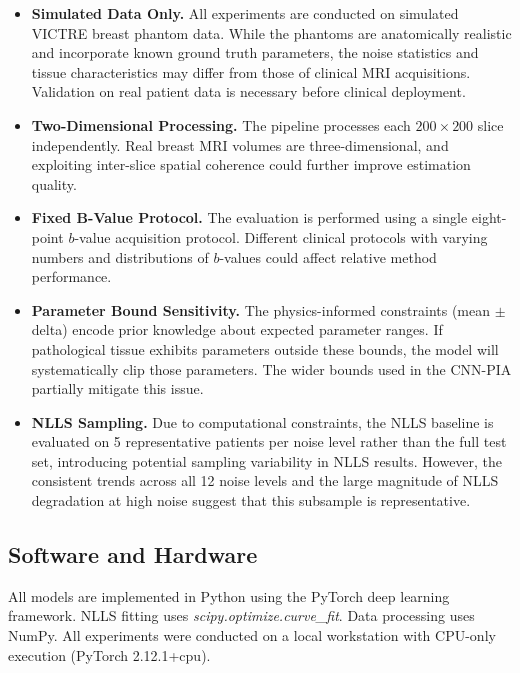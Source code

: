 \documentclass[12pt]{article}
\begin{document}
\begin{itemize}
    \item \textbf{Simulated Data Only.} All experiments are conducted on simulated VICTRE breast phantom data. While the phantoms are anatomically realistic and incorporate known ground truth parameters, the noise statistics and tissue characteristics may differ from those of clinical MRI acquisitions. Validation on real patient data is necessary before clinical deployment.
    \item \textbf{Two-Dimensional Processing.} The pipeline processes each $200{\times}200$ slice independently. Real breast MRI volumes are three-dimensional, and exploiting inter-slice spatial coherence could further improve estimation quality.
    \item \textbf{Fixed B-Value Protocol.} The evaluation is performed using a single eight-point $b$-value acquisition protocol. Different clinical protocols with varying numbers and distributions of $b$-values could affect relative method performance.
    \item \textbf{Parameter Bound Sensitivity.} The physics-informed constraints (mean $\pm$ delta) encode prior knowledge about expected parameter ranges. If pathological tissue exhibits parameters outside these bounds, the model will systematically clip those parameters. The wider bounds used in the CNN-PIA partially mitigate this issue.
    \item \textbf{NLLS Sampling.} Due to computational constraints, the NLLS baseline is evaluated on 5 representative patients per noise level rather than the full test set, introducing potential sampling variability in NLLS results. However, the consistent trends across all 12 noise levels and the large magnitude of NLLS degradation at high noise suggest that this subsample is representative.
\end{itemize}

\subsection{Software and Hardware}

All models are implemented in Python using the PyTorch deep learning framework. NLLS fitting uses \textit{scipy.optimize.curve\_fit}. Data processing uses NumPy. All experiments were conducted on a local workstation with CPU-only execution (PyTorch 2.12.1+cpu).
\end{document}
